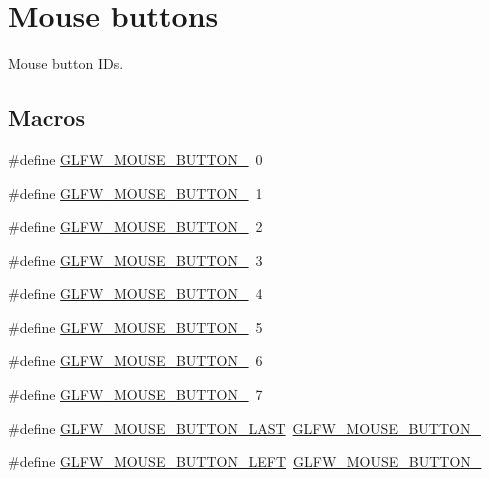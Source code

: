 \hypertarget{group__buttons}{}\section{Mouse buttons}
\label{group__buttons}


Mouse button I\+Ds.  


\subsection*{Macros}
\begin{DoxyCompactItemize}
\item 
\#define \mbox{\hyperlink{group__buttons_ga181a6e875251fd8671654eff00f9112e}{G\+L\+F\+W\+\_\+\+M\+O\+U\+S\+E\+\_\+\+B\+U\+T\+T\+O\+N\+\_}}~0
\item 
\#define \mbox{\hyperlink{group__buttons_ga604b39b92c88ce9bd332e97fc3f4156c}{G\+L\+F\+W\+\_\+\+M\+O\+U\+S\+E\+\_\+\+B\+U\+T\+T\+O\+N\+\_}}~1
\item 
\#define \mbox{\hyperlink{group__buttons_ga0130d505563d0236a6f85545f19e1721}{G\+L\+F\+W\+\_\+\+M\+O\+U\+S\+E\+\_\+\+B\+U\+T\+T\+O\+N\+\_}}~2
\item 
\#define \mbox{\hyperlink{group__buttons_ga53f4097bb01d5521c7d9513418c91ca9}{G\+L\+F\+W\+\_\+\+M\+O\+U\+S\+E\+\_\+\+B\+U\+T\+T\+O\+N\+\_}}~3
\item 
\#define \mbox{\hyperlink{group__buttons_gaf08c4ddecb051d3d9667db1d5e417c9c}{G\+L\+F\+W\+\_\+\+M\+O\+U\+S\+E\+\_\+\+B\+U\+T\+T\+O\+N\+\_}}~4
\item 
\#define \mbox{\hyperlink{group__buttons_gae8513e06aab8aa393b595f22c6d8257a}{G\+L\+F\+W\+\_\+\+M\+O\+U\+S\+E\+\_\+\+B\+U\+T\+T\+O\+N\+\_}}~5
\item 
\#define \mbox{\hyperlink{group__buttons_ga8b02a1ab55dde45b3a3883d54ffd7dc7}{G\+L\+F\+W\+\_\+\+M\+O\+U\+S\+E\+\_\+\+B\+U\+T\+T\+O\+N\+\_}}~6
\item 
\#define \mbox{\hyperlink{group__buttons_ga35d5c4263e0dc0d0a4731ca6c562f32c}{G\+L\+F\+W\+\_\+\+M\+O\+U\+S\+E\+\_\+\+B\+U\+T\+T\+O\+N\+\_}}~7
\item 
\#define \mbox{\hyperlink{group__buttons_gab1fd86a4518a9141ec7bcde2e15a2fdf}{G\+L\+F\+W\+\_\+\+M\+O\+U\+S\+E\+\_\+\+B\+U\+T\+T\+O\+N\+\_\+\+L\+A\+ST}}~\mbox{\hyperlink{group__buttons_ga35d5c4263e0dc0d0a4731ca6c562f32c}{G\+L\+F\+W\+\_\+\+M\+O\+U\+S\+E\+\_\+\+B\+U\+T\+T\+O\+N\+\_}}
\item 
\#define \mbox{\hyperlink{group__buttons_gaf37100431dcd5082d48f95ee8bc8cd56}{G\+L\+F\+W\+\_\+\+M\+O\+U\+S\+E\+\_\+\+B\+U\+T\+T\+O\+N\+\_\+\+L\+E\+FT}}~\mbox{\hyperlink{group__buttons_ga181a6e875251fd8671654eff00f9112e}{G\+L\+F\+W\+\_\+\+M\+O\+U\+S\+E\+\_\+\+B\+U\+T\+T\+O\+N\+\_}}

\end{DoxyCompactItemize}
